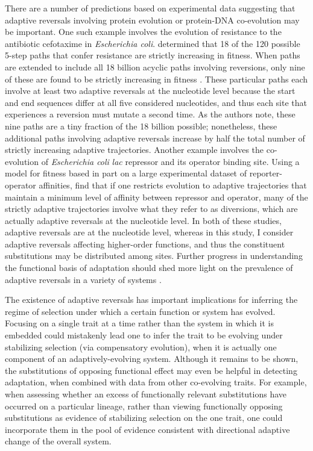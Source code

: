 \documentclass[dvips,12pt,twoside,titlepage]{article}
\begin{document}
There are a number of predictions based on experimental data suggesting that adaptive reversals involving protein evolution or protein-DNA co-evolution may be important. One such example involves the evolution of resistance to the antibiotic cefotaxime in \emph{Escherichia coli}.  determined that 18 of the 120 possible 5-step paths that confer resistance are strictly increasing in fitness. When paths are extended to include all 18 billion acyclic paths involving reversions, only nine of these are found to be strictly increasing in fitness \cite{Depristo:2007co}. These particular paths each involve at least two adaptive reversals at the nucleotide level because the start and end sequences differ at all five considered nucleotides, and thus each site that experiences a reversion must mutate a second time. As the authors note, these nine paths are a tiny fraction of the 18 billion possible; nonetheless, these additional paths involving adaptive reversals increase by half the total number of strictly increasing adaptive trajectories. Another example involves the co-evolution of \emph{Escherichia coli} \emph{lac} repressor and its operator binding site. Using a model for fitness based in part on a large experimental dataset of reporter-operator affinities,  find that if one restricts evolution to adaptive trajectories that maintain a minimum level of affinity between repressor and operator, many of the strictly adaptive trajectories involve what they refer to as diversions, which are actually adaptive reversals at the nucleotide level. In both of these studies, adaptive reversals are at the nucleotide level, whereas in this study, I consider adaptive reversals affecting higher-order functions, and thus the constituent substitutions may be distributed among sites. 
Further progress in understanding the functional basis of adaptation should shed more light on the prevalence of adaptive reversals in a variety of systems \cite{Dean:2007ba}.

The existence of adaptive reversals has important implications for inferring the regime of selection under which a certain function or system has evolved.
Focusing on a single trait at a time rather than the system in which it is embedded could mistakenly lead one to infer the trait to be evolving under stabilizing selection (via compensatory evolution), when it is actually one component of an adaptively-evolving system.
Although it remains to be shown, the substitutions of opposing functional effect may even be helpful in detecting adaptation, when combined with data from other co-evolving traits. 
For example, when assessing whether an excess of functionally relevant substitutions have occurred on a particular lineage, rather than viewing functionally opposing substitutions as evidence of stabilizing selection on the one trait, one could incorporate them in the pool of evidence consistent with directional adaptive change of the overall system.
 
\end{document}
